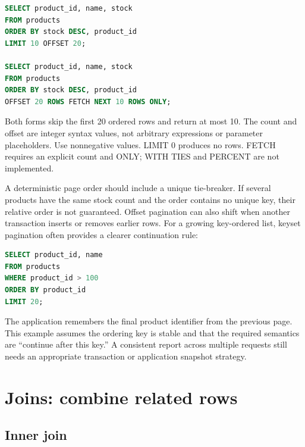 \begin{lstlisting}[language=SQL]
SELECT product_id, name, stock
FROM products
ORDER BY stock DESC, product_id
LIMIT 10 OFFSET 20;

SELECT product_id, name, stock
FROM products
ORDER BY stock DESC, product_id
OFFSET 20 ROWS FETCH NEXT 10 ROWS ONLY;
\end{lstlisting}

Both forms skip the first 20 ordered rows and return at most 10. The count and offset are integer syntax values, not arbitrary expressions or parameter placeholders. Use nonnegative values. LIMIT 0 produces no rows. FETCH requires an explicit count and ONLY; WITH TIES and PERCENT are not implemented.

A deterministic page order should include a unique tie-breaker. If several products have the same stock count and the order contains no unique key, their relative order is not guaranteed. Offset pagination can also shift when another transaction inserts or removes earlier rows. For a growing key-ordered list, keyset pagination often provides a clearer continuation rule:

\begin{lstlisting}[language=SQL]
SELECT product_id, name
FROM products
WHERE product_id > 100
ORDER BY product_id
LIMIT 20;
\end{lstlisting}

The application remembers the final product identifier from the previous page. This example assumes the ordering key is stable and that the required semantics are ``continue after this key.'' A consistent report across multiple requests still needs an appropriate transaction or application snapshot strategy.


\section{Joins: combine related rows}
\label{sql:joins}

\subsection{Inner join}

